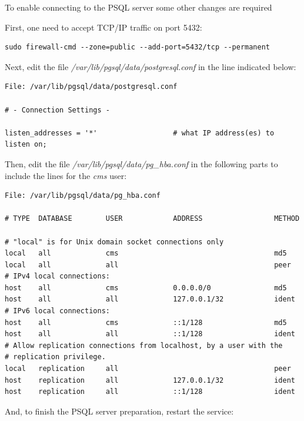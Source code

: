 \documentclass[10pt,a4paper]{article}
\begin{document}
To enable connecting to the PSQL server some other changes are required 

First, one need to accept TCP/IP traffic on port 5432:

\begin{framed}
\begin{verbatim}
sudo firewall-cmd --zone=public --add-port=5432/tcp --permanent
\end{verbatim}
\end{framed}

Next, edit the file \emph{/var/lib/pgsql/data/postgresql.conf} in the line indicated below:

\begin{framed}
\begin{verbatim}
File: /var/lib/pgsql/data/postgresql.conf

# - Connection Settings -

listen_addresses = '*'                  # what IP address(es) to listen on;
\end{verbatim}
\end{framed}

Then, edit the file \emph{/var/lib/pgsql/data/pg\_hba.conf} in the following parts to include the lines for the \textit{cms} user:

\begin{framed}
\begin{verbatim}
File: /var/lib/pgsql/data/pg_hba.conf

# TYPE  DATABASE        USER            ADDRESS                 METHOD

# "local" is for Unix domain socket connections only
local   all             cms                                     md5
local   all             all                                     peer
# IPv4 local connections:
host    all             cms             0.0.0.0/0               md5
host    all             all             127.0.0.1/32            ident
# IPv6 local connections:
host    all             cms             ::1/128                 md5
host    all             all             ::1/128                 ident
# Allow replication connections from localhost, by a user with the
# replication privilege.
local   replication     all                                     peer
host    replication     all             127.0.0.1/32            ident
host    replication     all             ::1/128                 ident
\end{verbatim}
\end{framed}

And, to finish the PSQL server preparation, restart the service: 
\end{document}
